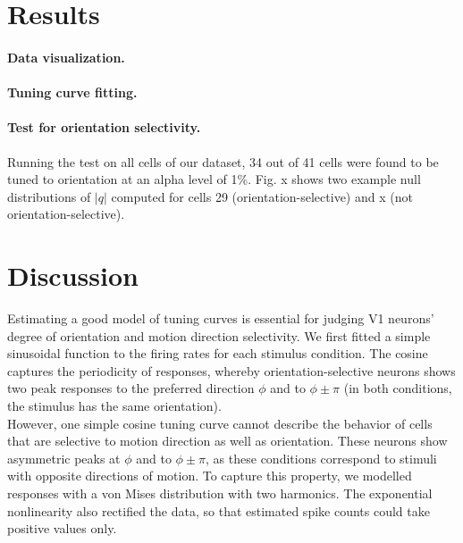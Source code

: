 \documentclass[10pt]{article}
\begin{document}
\section*{Results}
 
\paragraph{Data visualization.} 

\paragraph{Tuning curve fitting.}

\paragraph{Test for orientation selectivity.} Running the test on all cells of our dataset, 34 out of 41 cells were found to be tuned to orientation at an alpha level of 1\%. Fig. x shows two example null distributions of $|q|$ computed for cells 29 (orientation-selective) and x (not orientation-selective).

 
\section*{Discussion}

Estimating a good model of tuning curves is essential for judging V1 neurons' degree of orientation and motion direction selectivity. We first fitted a simple sinusoidal function to the firing rates for each stimulus condition. The cosine captures the periodicity of responses, whereby orientation-selective neurons shows two peak responses to the preferred direction $\phi$ and to $\phi \pm \pi$ (in both conditions, the stimulus has the same orientation). \\

However, one simple cosine tuning curve cannot describe the behavior of cells that are selective to motion direction as well as orientation. These neurons show asymmetric peaks at $\phi$ and to $\phi \pm \pi$, as these conditions correspond to stimuli with opposite directions of motion. To capture this property, we modelled responses with a von Mises distribution with two harmonics. The exponential nonlinearity also rectified the data, so that estimated spike counts could take positive values only. \\
\end{document}
